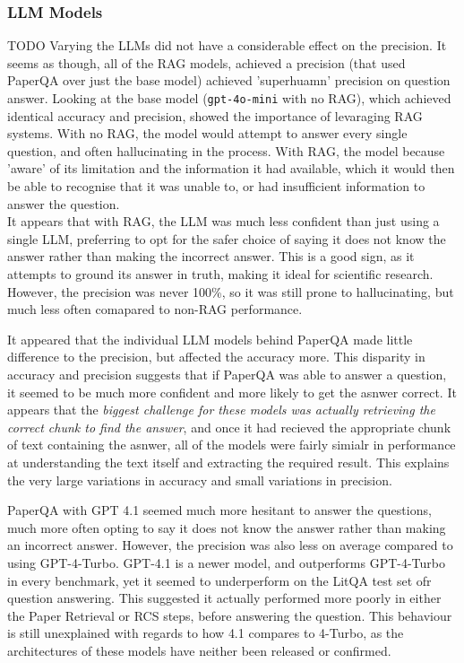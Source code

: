 \subsubsection{LLM Models} TODO
Varying the LLMs did not have a considerable effect on the precision. It seems as though, all of the RAG models, achieved a precision (that used PaperQA over just the base model) achieved 'superhuamn' precision on question answer. Looking at the base model (\texttt{gpt-4o-mini} with no RAG), which achieved identical accuracy and precision, showed the importance of levaraging RAG systems. With no RAG, the model would attempt to answer every single question, and often hallucinating in the process. With RAG, the model because 'aware' of its limitation and the information it had available, which it would then be able to recognise that it was unable to, or had insufficient information to answer the question. \\

It appears that with RAG, the LLM was much less confident than just using a single LLM, preferring to opt for the safer choice of saying it does not know the answer rather than making the incorrect answer. This is a good sign, as it attempts to ground its answer in truth, making it ideal for scientific research. However, the precision was never 100\%, so it was still prone to hallucinating, but much less often comapared to non-RAG performance. 

It appeared that the individual LLM models behind PaperQA made little difference to the precision, but affected the accuracy more. This disparity in accuracy and precision suggests that if PaperQA was able to answer a question, it seemed to be much more confident and more likely to get the asnwer correct. It appears that the \textit{biggest challenge for these models was actually retrieving the correct chunk to find the answer}, and once it had recieved the appropriate chunk of text containing the asnwer, all of the models were fairly simialr in performance at understanding the text itself and extracting the required result. This explains the very large variations in accuracy and small variations in precision. 

PaperQA with GPT 4.1 seemed much more hesitant to answer the questions, much more often opting to say it does not know the answer rather than making an incorrect answer. However, the precision was also less on average compared to using GPT-4-Turbo. GPT-4.1 is a newer model, and outperforms GPT-4-Turbo in every benchmark, yet it seemed to underperform on the LitQA test set ofr question answering. This suggested it actually performed more poorly in either the Paper Retrieval or RCS steps, before answering the question. This behaviour is still unexplained with regards to how 4.1 compares to 4-Turbo, as the architectures of these models have neither been released or confirmed. 

